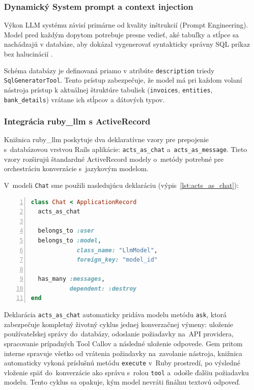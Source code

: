 \subsubsection{Dynamický System prompt a context injection}
Výkon LLM systému závisí primárne od kvality inštrukcií (Prompt Engineering). Model
pred každým dopytom potrebuje presne vedieť, aké tabuľky a stĺpce sa nachádzajú
v databáze, aby dokázal vygenerovať syntakticky správny SQL príkaz bez halucinácií
\cite{zhao2023}.

Schéma databázy je definovaná priamo v atribúte \texttt{description} triedy
\texttt{SqlGeneratorTool}. Tento prístup zabezpečuje, že model má pri každom volaní
nástroja prístup k aktuálnej štruktúre tabuliek (\texttt{invoices}, \texttt{entities},
\texttt{bank\_details}) vrátane ich stĺpcov a dátových typov.

\subsubsection{Integrácia ruby\_llm s ActiveRecord}

Knižnica ruby\_llm poskytuje dva deklaratívne vzory pre prepojenie s~databázovou vrstvou
Rails aplikácie: \texttt{acts\_as\_chat} a~\texttt{acts\_as\_message}. Tieto vzory
rozširujú štandardné ActiveRecord modely o~metódy potrebné pre orchestráciu konverzácie
s~jazykovým modelom.

V~modeli \texttt{Chat} sme použili nasledujúcu deklaráciu (výpis~\ref{lst:acts_as_chat}):

\begin{lstlisting}[language=Ruby,
    caption={Deklarácia \texttt{acts\_as\_chat} v modeli Chat},
    label={lst:acts_as_chat},
    basicstyle=\ttfamily\small,
    keywordstyle=\color{blue},
    commentstyle=\color{gray},
    stringstyle=\color{red!70!black},
    numbers=left,
    numberstyle=\tiny\color{gray},
    breaklines=true,
    frame=single
]
class Chat < ApplicationRecord
  acts_as_chat

  belongs_to :user
  belongs_to :model,
             class_name: "LlmModel",
             foreign_key: "model_id"

  has_many :messages,
           dependent: :destroy
end
\end{lstlisting}

Deklarácia \texttt{acts\_as\_chat} automaticky pridáva modelu metódu \texttt{ask},
ktorá zabezpečuje kompletný životný cyklus jednej konverzačnej výmeny: uloženie používateľskej
správy do~databázy, odoslanie požiadavky na~API providera, spracovanie prípadných
Tool Callov a následné uloženie odpovede. Gem pritom interne spravuje všetko od
vrátenia požiadavky na~zavolanie nástroja, knižnica automaticky vykoná príslušnú metódu
\texttt{execute} v~Ruby prostredí, po výsledné vloženie späť do~konverzácie ako správu
s~rolou \texttt{tool} a~odošle ďalšiu požiadavku modelu. Tento cyklus sa opakuje,
kým model nevráti finálnu textovú odpoveď.

